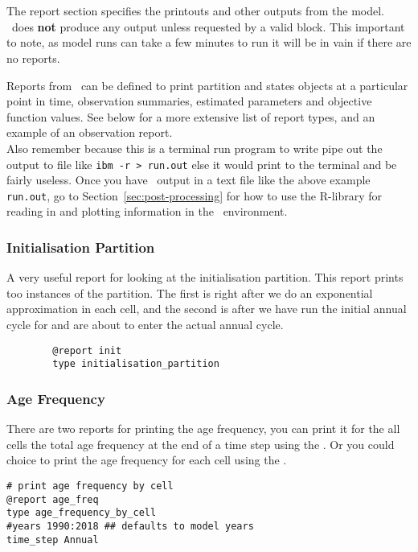 \section{\label{sec:report-section}}
The report section specifies the printouts and other outputs from the model. \IBM\ does \textbf{not} produce any output unless requested by a valid  block. This important to note, as model runs can take a few minutes to run it will be in vain if there are no reports.

Reports from \IBM\ can be defined to print partition and states objects at a particular point in time, observation summaries, estimated parameters and objective function values. See below for a more extensive list of report types, and an example of an observation report.\\

Also remember because this is a terminal run program to write pipe out the output to file like \texttt{ibm -r > run.out} else it would print to the terminal and be fairly useless. Once you have \IBM\ output in a text file like the above example \texttt{run.out}, go to Section~\ref{sec:post-processing} for how to use the R-library for reading in and plotting information in the \R\ environment.


\subsubsection{Initialisation Partition}
A very useful report for looking at the initialisation partition. This report prints too instances of the partition. The first is right after we do an exponential approximation in each cell, and the second is after we have run the initial annual cycle for  and are about to enter the actual annual cycle.

{\small{\begin{verbatim}
		@report init
		type initialisation_partition
\end{verbatim}}}

\textsl{}
\subsubsection{Age Frequency}
There are two reports for printing the age frequency, you can print it for the all cells the total age frequency at the end of a time step using the  . Or you could choice to print the age frequency for each cell using the  . 
{\small{\begin{verbatim}
# print age frequency by cell
@report age_freq
type age_frequency_by_cell
#years 1990:2018 ## defaults to model years
time_step Annual
\end{verbatim}}}


